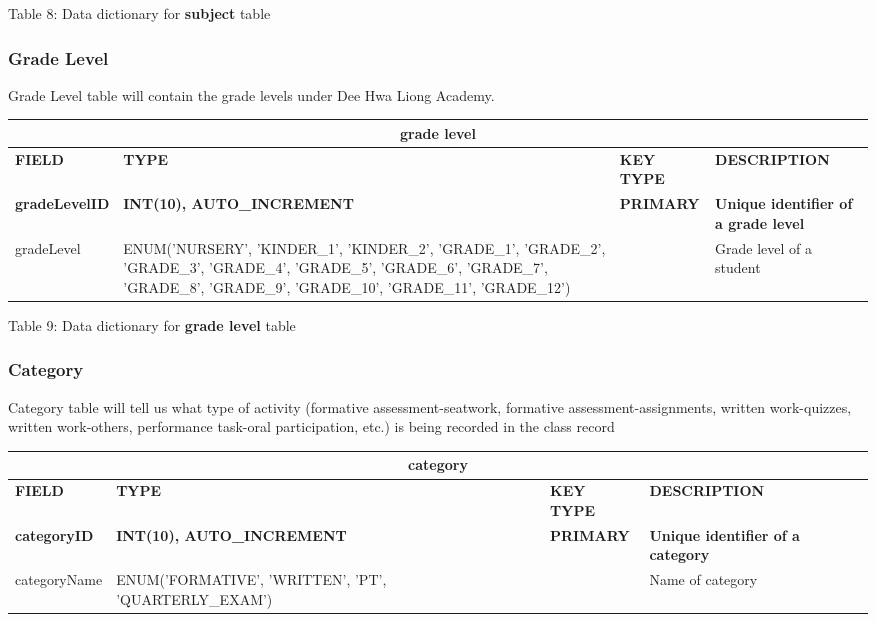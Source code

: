 \documentclass[11pt,a4paper,titlepage]{article}
\begin{document}
\vspace{.5cm}
\begin{center}
    Table 8: Data dictionary for \textbf{subject} table
\end{center}


\subsubsection{Grade Level}

Grade Level table will contain the grade levels under Dee Hwa Liong Academy.

\vspace{1cm}
\begin{longtable}{ |p{2.5cm}|p{4.5cm}|p{2.5cm}|p{3cm}|  }
    \hline
    \multicolumn{4}{|c|}{\textbf{grade level}} \\
    \hline
    \textbf{FIELD}&\textbf{TYPE}&\textbf{KEY TYPE}&\textbf{DESCRIPTION}\\
    \hline
    \textbf{gradeLevelID}   & \textbf{INT(10), AUTO\_INCREMENT} & \textbf{PRIMARY} & \textbf{Unique identifier of a grade level}\\ \hline
    gradeLevel & ENUM('NURSERY', 'KINDER\_1', 'KINDER\_2', 'GRADE\_1', 'GRADE\_2', 'GRADE\_3', 'GRADE\_4', 'GRADE\_5', 'GRADE\_6', 'GRADE\_7', 'GRADE\_8', 'GRADE\_9', 'GRADE\_10', 'GRADE\_11', 'GRADE\_12') & & Grade level of a student \\ \hline
\end{longtable}

\vspace{.5cm}
\begin{center}
    Table 9: Data dictionary for \textbf{grade level} table
\end{center}


\subsubsection{Category}

Category table will tell us what type of activity (formative assessment-seatwork, formative assessment-assignments, written work-quizzes, written work-others, performance task-oral participation, etc.) is being recorded in the class record

\vspace{1cm}
\begin{longtable}{ |p{2.5cm}|p{4.5cm}|p{2.5cm}|p{3cm}|  }
    \hline
    \multicolumn{4}{|c|}{\textbf{category}} \\
    \hline
    \textbf{FIELD}&\textbf{TYPE}&\textbf{KEY TYPE}&\textbf{DESCRIPTION}\\
    \hline
    \textbf{categoryID}  & \textbf{INT(10), AUTO\_INCREMENT} & \textbf{PRIMARY} & \textbf{Unique identifier of a category}\\ \hline
    categoryName & ENUM('FORMATIVE', 'WRITTEN', 'PT', 'QUARTERLY\_EXAM') & & Name of category \\ \hline
\end{longtable}
\end{document}
